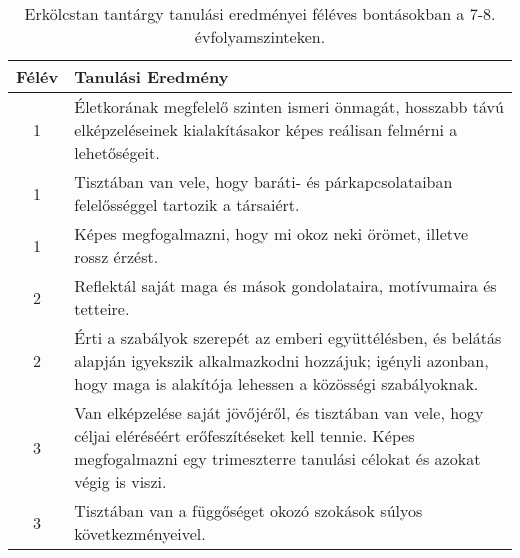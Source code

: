        
           \begin{longtable}{c | p{12cm} }
            \caption[Erkölcstan 7-8.]{Erkölcstan tantárgy tanulási eredményei féléves bontásokban a 7-8. évfolyamszinteken. }  \\

            \textbf{Félév} & \textbf{Tanulási Eredmény} \\
            \hline
            \endhead
                                
                                          1 &  Életkorának megfelelő szinten ismeri önmagát, hosszabb távú elképzeléseinek kialakításakor képes reálisan felmérni a lehetőségeit. \\ \hline
                                          1 &  Tisztában van vele, hogy baráti- és párkapcsolataiban felelősséggel tartozik a társaiért. \\ \hline
                                          1 &  Képes megfogalmazni, hogy mi okoz neki örömet, illetve rossz érzést. \\ \hline
                                      
                                
                                          2 &  Reflektál saját maga és mások gondolataira, motívumaira és tetteire. \\ \hline
                                          2 &  Érti a szabályok szerepét az emberi együttélésben, és belátás alapján igyekszik alkalmazkodni hozzájuk; igényli azonban, hogy maga is alakítója lehessen a közösségi szabályoknak. \\ \hline
                                      
                                
                                          3 &  Van elképzelése saját jövőjéről, és tisztában van vele, hogy céljai eléréséért erőfeszítéseket kell tennie. Képes megfogalmazni egy trimeszterre tanulási célokat és azokat végig is viszi. \\ \hline
                                          3 &  Tisztában van a függőséget okozó szokások súlyos következményeivel. \\ \hline
                                      

\end{longtable}
